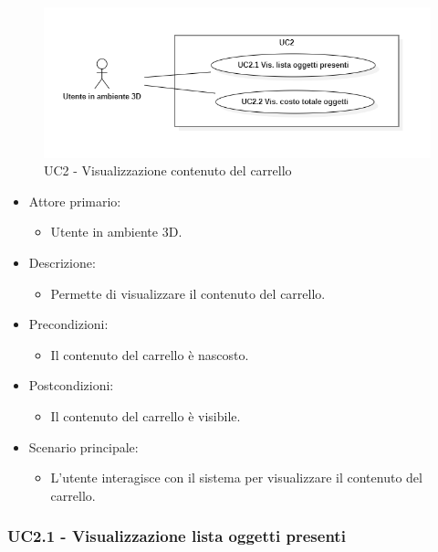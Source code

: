 \begin{figure}[H]
  \renewcommand{\thefigure}{2}
  \includegraphics[width=\linewidth]{./res/images/UC2.png}
  \caption{UC2 - Visualizzazione contenuto del carrello}
  \label{fig:UC 2}
\end{figure}

\begin{itemize}
	
	\item Attore primario: 
	\begin{itemize}
		\item Utente in ambiente 3D.
	\end{itemize}
	\item Descrizione:
	\begin{itemize}
		\item Permette di visualizzare il contenuto del carrello.
	\end{itemize}
	
	\item Precondizioni:
	\begin{itemize}
		\item Il contenuto del carrello è nascosto.
	\end{itemize}
	
	\item Postcondizioni:
	\begin{itemize}
		\item Il contenuto del carrello è visibile.
	\end{itemize}
	
	\item Scenario principale:
	\begin{itemize}
		\item L'utente interagisce con il sistema per visualizzare il contenuto del carrello.
	\end{itemize}
	
\end{itemize}

\subsubsection{UC2.1 - Visualizzazione lista oggetti presenti}

